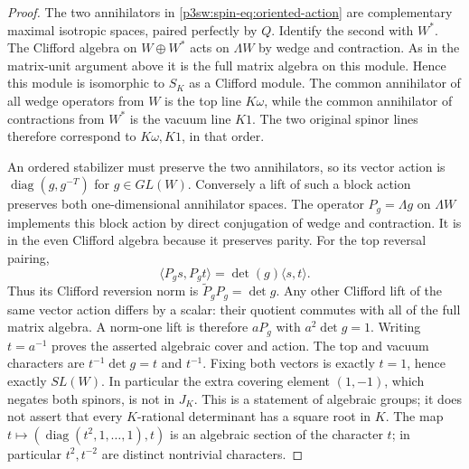 \documentclass[11pt]{article}
\numberwithin{equation}{section}
\begin{document}
\begin{proof}
The two annihilators in
\eqref{p3sw:spin-eq:oriented-action} are complementary maximal
isotropic spaces, paired perfectly by \(Q\).  Identify the second
with \(W^*\).  The Clifford algebra on \(W\oplus W^*\) acts on
\(\Lambda W\) by wedge and contraction.  As in the matrix-unit
argument above it is the full matrix algebra on this module.
Hence this module is isomorphic to \(S_K\) as a Clifford module.
The common annihilator of all wedge operators from \(W\) is the top
line \(K\omega\), while the common annihilator of contractions from
\(W^*\) is the vacuum line \(K1\).  The two original spinor lines
therefore correspond to \(K\omega,K1\), in that order.

An ordered stabilizer must preserve the two annihilators, so its
vector action is \(\operatorname{diag}(g,g^{-T})\) for \(g\in GL(W)\).
Conversely a lift of such a block action preserves both one-dimensional
annihilator spaces.  The operator \(P_g=\Lambda g\) on \(\Lambda W\)
implements this block action by direct conjugation of wedge and
contraction.  It is in the even Clifford algebra because it preserves
parity.  For the top reversal pairing,
\[
 \langle P_gs,P_gt\rangle=\det(g)\langle s,t\rangle.
\]
Thus its Clifford reversion norm is \(\widetilde P_gP_g=\det g\).
Any other Clifford lift of the same vector action differs by a scalar:
their quotient commutes with all of the full matrix algebra.
A norm-one lift is therefore \(aP_g\) with \(a^2\det g=1\).
Writing \(t=a^{-1}\) proves the asserted algebraic cover and action.
The top and vacuum characters are \(t^{-1}\det g=t\) and \(t^{-1}\).
Fixing both vectors is exactly \(t=1\), hence exactly \(SL(W)\).
In particular the extra covering element \((1,-1)\), which negates
both spinors, is not in \(J_K\).  This is a statement of algebraic
groups; it does not assert that every \(K\)-rational determinant has
a square root in \(K\).  The map
\(t\mapsto(\operatorname{diag}(t^2,1,\ldots,1),t)\) is an algebraic
section of the character \(t\); in particular \(t^2,t^{-2}\) are
distinct nontrivial characters.


\end{proof}
\end{document}
